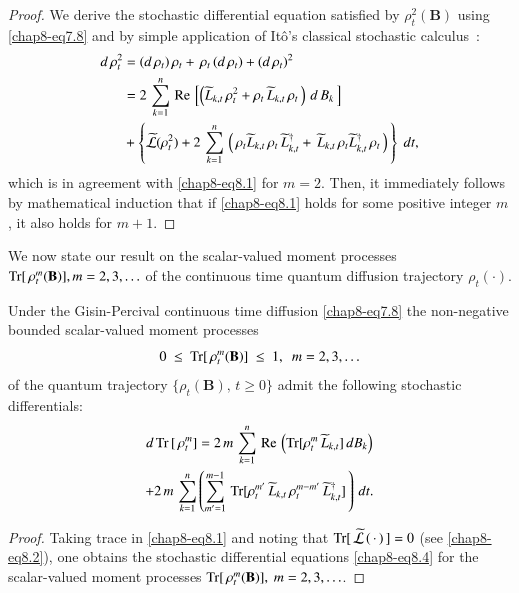 \begin{proof}
We derive the stochastic differential equation satisfied by $\rho_t^2(\mathbf{B})$  using \eqref{chap8-eq7.8} and by simple application of It\^o's classical stochastic calculus~\cite{chap8-key38}: 
\begin{align}
d\, \rho_t^2 & = (d\, \rho_t)\, \rho_t +\, \rho_t\, (d\, \rho_t)+ (d\, \rho_t)^2\nonumber \\ 
&= 2\, \sum_{k=1}^{n}\,  {\rm Re}\, \left[\left(\widetilde{L}_{k,t}\, \rho^{2}_t + \rho_t\, \widetilde{L}_{k,t}\, \rho_t\,\right)\, d\, B_{k}\, \right] \nonumber \\
& + \left\{ \widetilde{\mathcal{L}}(\rho_t^2) + 2\, \sum_{k=1}^{n}\,\left(\, \rho_t \widetilde{L}_{k,t}\, \rho_t\, \widetilde{L}^\dag_{k,t} + \,   \widetilde{L}_{k,t}\,\rho_t \widetilde{L}^\dag_{k,t}\, \rho_t  \, \right) \, \right\}\  dt,  \label{chap8-eq8.3} 
\end{align}
which is in agreement with \eqref{chap8-eq8.1} for $m=2$. Then, it immediately follows by mathematical induction that if \eqref{chap8-eq8.1} holds for some positive integer $m$, it also holds for $m+1$. 
\end{proof}

We now state our result on the scalar-valued moment processes ${\rm Tr}[\, \rho_t^m(\mathbf{B})], m=2,3,\ldots$  of the continuous time quantum diffusion trajectory $\rho_t(\cdot)$.

\begin{thm}\label{chap8-thm4}
Under the Gisin-Percival continuous time diffusion \eqref{chap8-eq7.8} the non-negative bounded scalar-valued  moment processes  
$$0~\leq~{\rm Tr}[\, \rho_t^m(\mathbf{B})]~\leq~ 1,\ \  m=2,3,\ldots$$ 
of the quantum trajectory $\{\rho_t(\mathbf{B}),\, t\geq 0\}$ admit the following stochastic differentials:
\begin{multline}
d\, {\rm Tr}\,[\, \rho_t^m] = 2\, m\, \sum_{k=1}^n\, {\rm Re}\,\left( {\rm Tr}[\rho_t^m\, \widetilde{L}_{k,t}]\, dB_{k}\right)  \\
+ 2\, m\, \sum_{k=1}^n\left(\sum_{m'=1}^{m-1}\, {\rm Tr}[\rho_t^{m'}\, \widetilde{L}_{k,t}\, \rho_t^{m-m'}\, \widetilde{L}_{k,t}^\dag]\,\right)\, dt.  \label{chap8-eq8.4}
\end{multline}   
\end{thm}

\begin{proof}
Taking trace in \eqref{chap8-eq8.1} and  noting   that ${\rm Tr}[\,\widetilde{\mathcal{L}}\,(\,\cdot\,)\,]=0$ (see \eqref{chap8-eq8.2}), one obtains the stochastic differential equations \eqref{chap8-eq8.4} for the scalar-valued moment processes ${\rm Tr}[\, \rho_t^m(\mathbf{B})],\ m=2,3,\ldots$. 
\end{proof}

